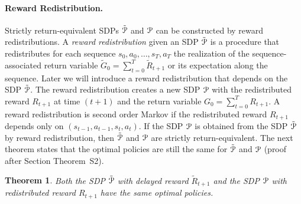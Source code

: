 \documentclass{article}
\newtheorem{theorem}{Theorem}
\begin{document}
\paragraph{Reward Redistribution.}
Strictly return-equivalent SDPs $\tilde{\mathcal{P}}$ and $\mathcal{P}$
can be constructed by reward redistributions.
A {\em reward redistribution} given an SDP $\tilde{\mathcal{P}}$ 
is a procedure that redistributes 
for each sequence $s_0,a_0,\ldots,s_T,a_T$ the realization of 
the sequence-associated return variable 
$\tilde{G}_0 = \sum_{t=0}^{T}  \tilde{R}_{t+1}$ 
or its expectation along the sequence. 
Later we will introduce a reward redistribution that 
depends on the SDP $\tilde{\mathcal{P}}$.
The reward redistribution creates a new SDP $\mathcal{P}$ with
the redistributed reward $R_{t+1}$ at time $(t+1)$ and the return variable
$G_0 = \sum_{t=0}^{T} R_{t+1}$. 
A reward redistribution is second order Markov if
the redistributed reward $R_{t+1}$ depends only on $(s_{t-1},a_{t-1},s_t,a_t)$. 
If the SDP $\mathcal{P}$ is obtained from the 
SDP $\tilde{\mathcal{P}}$ by reward redistribution, 
then $\tilde{\mathcal{P}}$ and $\mathcal{P}$ are strictly return-equivalent.
The next theorem states that the optimal policies are still the same 
for $\tilde{\mathcal{P}}$ and $\mathcal{P}$ (proof after Section Theorem~S2). 
\begin{theorem}
\label{th:EquivT}
Both the SDP $\tilde{\mathcal{P}}$ 
with delayed reward $\tilde{R}_{t+1}$
and the SDP $\mathcal{P}$ with redistributed reward $R_{t+1}$ 
have the same optimal policies.
\end{theorem}
\end{document}
